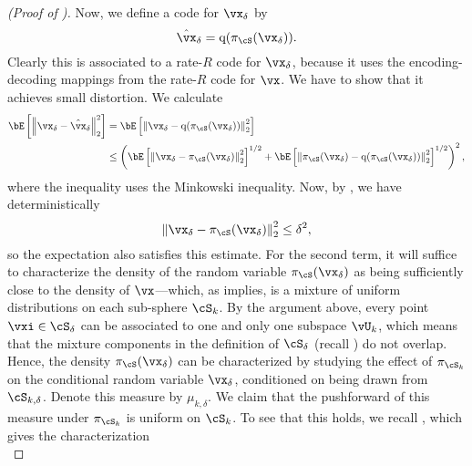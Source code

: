 \documentclass[../../book-main.tex]{subfiles}
\begin{document}
\begin{proof}[(Proof of )]
    Now, we define a code for $\vx_{\delta}$ by
    \begin{equation}
        \hat{\vx}_{\delta} = \mathrm{q}( \pi_{\cS}(\vx_{\delta}) ).
    \end{equation}
    Clearly this is associated to a rate-$R$ code for $\vx_{\delta}$, because it
    uses the encoding-decoding mappings from the rate-$R$ code for $\vx$. We
    have to show that it achieves small distortion.
    We calculate
    \begin{align}
        \bE\left[ \norm*{ \vx_{\delta} - \hat{\vx}_{\delta} }_2^2 \right]
        &=
        \bE\left[ \norm*{ \vx_{\delta} - \mathrm{q}(\pi_{\cS}(\vx_{\delta})) }_2^2 \right]
        \\
        &\leq
        \left(
        \bE\left[ \norm*{ \vx_{\delta} - \pi_{\cS}(\vx_{\delta}) }_2^2
        \right]^{1/2}
        + \bE\left[ \norm*{ \pi_{\cS}(\vx_{\delta})
        - \mathrm{q}(\pi_{\cS}(\vx_{\delta})) }_2^2 \right]^{1/2}
        \right)^2,\label{eq:distortion-decomposition}
    \end{align}
    where the inequality uses the Minkowski inequality.
    Now, by , we have
    deterministically
    \begin{equation}
        \norm*{ \vx_{\delta} - \pi_{\cS}(\vx_{\delta}) }_2^2
        \leq \delta^2,
    \end{equation}
    so the expectation also satisfies this estimate.
    For the second term, it will suffice to characterize the density of the
    random variable $\pi_{\cS}(\vx_{\delta})$ as being sufficiently close to the
    density of $\vx$---which, as  implies, is
    a mixture of uniform distributions on each sub-sphere $\cS_k$.
    By the argument above, every point $\vxi \in \cS_{\delta}$ can be associated
    to one and only one subspace $\vU_k$, which means that the mixture
    components in the definition of $\cS_{\delta}$ (recall
    ) do not overlap. Hence, the density
    $\pi_{\cS}(\vx_{\delta})$ can be characterized by studying the effect of
    $\pi_{\cS_k}$ on the conditional random variable $\vx_{\delta}$, conditioned
    on being drawn from $\cS_{k, \delta}$. Denote this measure by $\mu_{k,
    \delta}$.
    We claim that the pushforward of this measure under $\pi_{\cS_k}$ is uniform on $\cS_k$.
    To see that this holds, we recall
    ,
    which gives the characterization
    \begin{equation}

\end{equation}
\end{proof}
\end{document}
